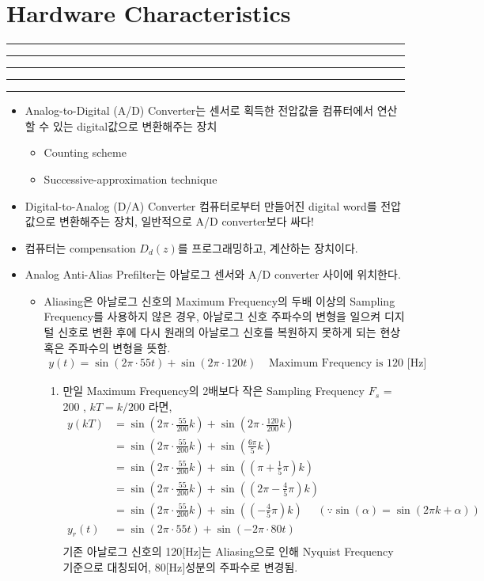 \setcounter{chapter}{7}
\setcounter{section}{3}
\section{Hardware Characteristics}
\vspace{-8pt} \hrule \hrule \hrule \hrule \hrule  \vspace{12pt}
\begin{itemize}
	\item Analog-to-Digital (A/D) Converter는 센서로 획득한 전압값을 컴퓨터에서 연산할 수 있는 digital값으로 변환해주는 장치
	\begin{itemize}
		\item Counting scheme 
		\item Successive-approximation technique 

	\end{itemize}
	\item Digital-to-Analog (D/A) Converter 컴퓨터로부터 만들어진 digital word를 전압값으로 변환해주는 장치, 일반적으로 A/D converter보다 싸다!
	\item 컴퓨터는 compensation $D_d(z)$를 프로그래밍하고, 계산하는 장치이다.
%
\newpage
%
	\item Analog Anti-Alias Prefilter는 아날로그 센서와 A/D converter 사이에 위치한다. 
	\begin{itemize}
		\item Aliasing은 아날로그 신호의 Maximum Frequency의 두배 이상의 Sampling Frequency를 사용하지 않은 경우, 아날로그 신호 주파수의 변형을 일으켜 디지털 신호로 변환 후에 다시 원래의 아날로그 신호를 복원하지 못하게 되는 현상 혹은 주파수의 변형을 뜻함.
		\begin{align*}
				y(t) = \sin(2 \pi \cdot 55t) +\sin(2\pi \cdot 120t) ~~~~~ \text{Maximum Frequency is 120 [Hz]}
		\end{align*}
		\begin{enumerate}
			\item 만일 Maximum Frequency의 2배보다 작은 Sampling Frequency $F_s$ = 200 \text{[Hz]}, $kT = k/200$ 라면,
				\begin{align*}
					y(kT) &=   \sin(2 \pi \cdot \frac{55}{200}  k) +\sin(2\pi \cdot \frac{120}{200}  k)\\
					      &=   \sin(2 \pi \cdot \frac{55}{200}  k) +\sin(\frac{6\pi}{5}  k)\\
					      &=   \sin(2 \pi \cdot \frac{55}{200}  k) +\sin((\pi + \frac{1}{5}\pi) k)\\
					      &=   \sin(2 \pi \cdot \frac{55}{200}  k) +\sin((2\pi - \frac{4}{5}\pi) k)\\
					      &=   \sin(2 \pi \cdot \frac{55}{200}  k) +\sin((- \frac{4}{5}\pi) k) ~~~~~~(\because \sin(\alpha) = \sin(2\pi k+ \alpha) )\\
					y_r(t)&=    \sin(2 \pi \cdot 55t) +\sin(-2\pi \cdot 80t)\\
				\end{align*}
				기존 아날로그 신호의 120[Hz]는 Aliasing으로 인해 Nyquist Frequency 기준으로 대칭되어, 80[Hz]성분의 주파수로 변경됨. 
				\newpage		
		\end{enumerate}


\end{itemize}
\end{itemize}

